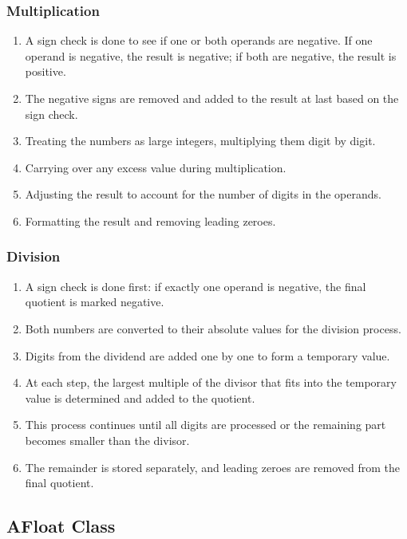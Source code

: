\documentclass[12pt]{article}
\begin{document}
\subsubsection{Multiplication}
\begin{enumerate}
    \item A sign check is done to see if one or both operands are negative. If one operand is negative, the result is negative; if both are negative, the result is positive.
    \item The negative signs are removed and added to the result at last based on the sign check.
    \item Treating the numbers as large integers, multiplying them digit by digit.
    \item Carrying over any excess value during multiplication.
    \item Adjusting the result to account for the number of digits in the operands.
    \item Formatting the result and removing leading zeroes.
\end{enumerate}

\subsubsection{Division}
\begin{enumerate}
    \item A sign check is done first: if exactly one operand is negative, the final quotient is marked negative.
    \item Both numbers are converted to their absolute values for the division process.
    \item Digits from the dividend are added one by one to form a temporary value.
    \item At each step, the largest multiple of the divisor that fits into the temporary value is determined and added to the quotient.
    \item This process continues until all digits are processed or the remaining part becomes smaller than the divisor.
    \item The remainder is stored separately, and leading zeroes are removed from the final quotient.
\end{enumerate}

\subsection{AFloat Class}
\end{document}
